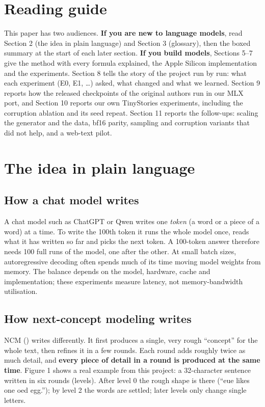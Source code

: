 \documentclass[
  british,
]{article}
\begin{document}
\section{Reading guide}\label{reading-guide}

This paper has two audiences. \textbf{If you are new to language
models}, read Section 2 (the idea in plain language) and Section 3
(glossary), then the boxed summary at the start of each later section.
\textbf{If you build models}, Sections 5--7 give the method with every
formula explained, the Apple Silicon implementation and the experiments.
Section 8 tells the story of the project run by run: what each
experiment (E0, E1, \ldots) asked, what changed and what we learned.
Section 9 reports how the released checkpoints of the original authors
run in our MLX port, and Section 10 reports our own TinyStories
experiments, including the corruption ablation and its seed repeat.
Section 11 reports the follow-ups: scaling the generator and the data,
bf16 parity, sampling and corruption variants that did not help, and a
web-text pilot.

\section{The idea in plain language}\label{the-idea-in-plain-language}

\subsection{How a chat model writes}\label{how-a-chat-model-writes}

A chat model such as ChatGPT or Qwen writes one \emph{token} (a word or
a piece of a word) at a time. To write the 100th token it runs the whole
model once, reads what it has written so far and picks the next token. A
100-token answer therefore needs 100 full runs of the model, one after
the other. At small batch sizes, autoregressive decoding often spends
much of its time moving model weights from memory. The balance depends
on the model, hardware, cache and implementation; these experiments
measure latency, not memory-bandwidth utilisation.

\subsection{How next-concept modeling
writes}\label{how-next-concept-modeling-writes}

NCM () writes differently. It
first produces a single, very rough ``concept'' for the whole text, then
refines it in a few rounds. Each round adds roughly twice as much
detail, and \textbf{every piece of detail in a round is produced at the
same time}. Figure 1 shows a real example from this project: a
32-character sentence written in six rounds (levels). After level 0 the
rough shape is there (``eue likes one oed egg.''); by level 2 the words
are settled; later levels only change single letters.
\end{document}
